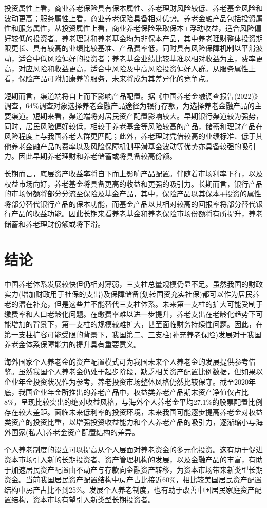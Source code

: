 \documentclass[a4paper,zihao=5]{ctexart}
\begin{document}
投资属性上看，商业养老保险具有保本属性、养老理财风险较低、养老基金风险和波动更高；服务属性上看，商业养老保险具备相对优势。养老金融产品包括投资属性和服务属性，从投资属性上看，商业养老保险采取保本+浮动收益，适合风险偏好较低的投资者。养老理财和养老基金均为非保本产品，其中养老理财整体投资期限更长、具有较高的业绩比较基准、产品费率低，同时具有风险保障机制以平滑波动，适合中低风险偏好的投资者；养老基金业绩比较基准以相对收益为主，费率更高，对应风险和收益更高，适合中风险及中高风险投资偏好人群。从服务属性上看，保险产品可附加康养等服务，未来将成为其差异化的竞争点。

短期而言，渠道端将自上而下影响产品配置。据《中国养老金融调查报告(2022)》调查，64\%调查对象选择养老金融产品途径为银行存款，为选择养老金融产品的主要渠道。短期来看，渠道端将对居民资产配置影响较大。早期银行渠道较为强势，同时，居民风险偏好较低，相较于养老基金等风险较高的产品，储蓄和理财产品在风险程度上与我国养老人群更匹配；此外，养老理财凭借较高的业绩标准、低于其他养老金融产品的费率以及风险保障机制平滑基金波动等优势亦具备较强的吸引力。因此早期养老理财和养老储蓄或将具备较高份额。

长期而言，底层资产收益率将自下而上影响产品配置。伴随着市场利率下行，以及权益市场向好，养老基金将具备更高的收益和更强的吸引力。长期而言，银行产品的市场份额将部分分流至保险及基金产品，其中，保险产品以其保本+投资的属性将部分替代银行产品的保本功能，而基金产品以其相对较高的回报率将部分替代银行产品的收益功能。因此长期来看养老基金和养老保险市场份额将有所提升，养老储蓄和养老理财份额或将下滑。

\section{结论}
中国养老体系发展较快但仍相对薄弱，三支柱总量规模仍显不足。虽然我国的财政实力(增加财政用于社保的支出)及保障储备(划转国资充实社保)都可以作为居民养老的潜在补充，但是这些并不能替代三支柱体系。未来第一支柱的扩大可能受制于缴费率和人口老龄化问题。在缴费率难以进一步提升，养老支出在老龄化趋势下可能增加的背景下，第一支柱的规模较难扩大，甚至面临财务持续性问题。因此，在第一支柱扩容可能受限的背景下，我国第二、三支柱(补充养老保险)发展对于我国养老金体系保障能力的提升具有重要意义。

海外国家个人养老金的资产配置模式可为我国未来个人养老金的发展提供参考借鉴。虽然我国个人养老金仍处于起步阶段，缺乏相关资产配置比例数据，但如果以企业年金投资状况作为参考，养老投资市场整体风格仍然比较保守。截至2020年底，我国企业年金所推出的养老产品中，权益类养老产品期末资产净值仅占比8\%，呈现比较突出的绝对收益风格，与海外个人养老金平均27.1\%的股票配置比例存在较大差距。面临未来低利率的投资环境，未来我国可能逐步提高养老金对权益类资产的投资比重，以增强投资收益能力和个人养老产品的吸引力，逐渐缩小与海外国家(私人)养老金资产配置结构的差异。

个人养老制度的设立可以提高从个人层面对养老资金的多元化投资。这有助于促进资本市场引入新的长期投资者、资产管理机构的发展，以及金融产品的丰富，有助于加速居民资产配置由不动产与存款向金融资产转移，为资本市场带来新类型长期资金。当前我国居民资产配置结构中房产占比接近60\%，相比较美国居民资产配置结构中房产占比不到25\%。发展个人养老制度，也有助于改善中国居民家庭资产配置结构，资本市场有望引入新类型长期投资者。

\clearpage
\appendix
\nocite{*}
\printbibliography[heading=bibliography]
\end{document}
